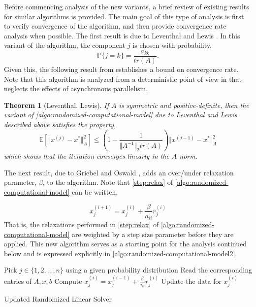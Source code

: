 \documentclass{article}
\newtheorem{theorem}{Theorem}
\theoremstyle{definition}
\theoremstyle{example}
\theoremstyle{example}
\theoremstyle{example}
\begin{document}
Before commencing analysis of the new variants, a brief review of existing results for similar algorithms is provided. The main goal of this type of analysis is first to verify convergence of the algorithm, and then provide convergence rate analysis when possible. The first result is due to Leventhal and Lewis \cite{leventhal2010randomized}. In this variant of the algorithm, the component $j$ is chosen with probability,
	\begin{equation}
		\mathbb{P}\{j = k\} = \frac{a_{kk}}{tr(A)}.
	\end{equation}
\noindent
Given this, the following result from \cite{leventhal2010randomized} establishes a bound on convergence rate. Note that this algorithm is analyzed from a deterministic point of view in \cite{leventhal2010randomized} that neglects the effects of asynchronous parallelism.

\begin{theorem}[Leventhal, Lewis]
	If $A$ is symmetric and positive-definite, then the variant of \cref{algo:randomized-computational-model} due to Leventhal and Lewis described above satisfies the property,
		\begin{equation}
			\mathbb{E}[\Vert x^{(j)} - x^* \Vert_A^2] \leq \left(1 - \frac{1}{\Vert A^{-1} \Vert_2 tr(A)}\right) \Vert x^{(j-1)} - x^* \Vert_A^2
		\end{equation}
	which shows that the iteration converges linearly in the $A$-norm.
\end{theorem}

The next result, due to Griebel and Oswald \cite{griebel2012greedy}, adds an over/under relaxation parameter, $\beta$, to the algorithm. Note that \cref{step:relax} of \cref{algo:randomized-computational-model} can be written,

\begin{equation}
	x_j^{(i+1)} = x_j^{(i)} + \frac{\beta}{a_{ii}} r_j^{(i)}
\end{equation}
\noindent
That is, the relaxations performed in \cref{step:relax} of \cref{algo:randomized-computational-model} are weighted by a step size parameter before they are applied. This new algorithm serves as a starting point for the analysis continued below and is expressed explicitly in \cref{algo:randomized-computational-model2}.

\begin{algorithm}[ht!]
	\DontPrintSemicolon
	 {
		 {
			Pick $j \in \{1, 2, \ldots, n\}$ using a given probability distribution \; \label{alg:pickrandom2}
			Read the corresponding entries of $A, x, b$ \label{step:read2}\;
			Compute $x^{(i)}_j = x^{(i-1)}_j + \frac{\beta}{a_{ii}} r^{(i)}_j$ \;
			Update the data for $x^{(i)}_j$ \;
		}
	}
	\caption{Updated Randomized Linear Solver}
	\label{algo:randomized-computational-model2}
\end{algorithm}
\end{document}
